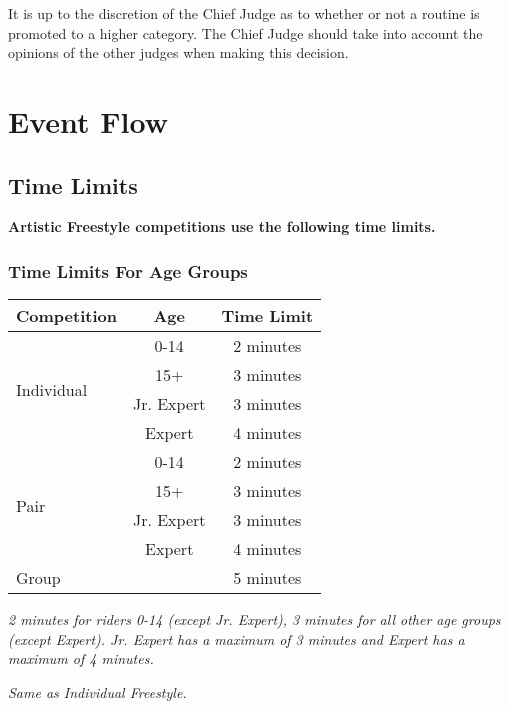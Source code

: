 It is up to the discretion of the Chief Judge as to whether or not a routine is promoted to a higher category.
The Chief Judge should take into account the opinions of the other judges when making this decision.

\section{Event Flow}

\subsection{Time Limits}

\textbf{Artistic Freestyle competitions use the following time limits.}

\subsubsection{Time Limits For Age Groups}

\begin{tabular}{|l|c|c|}
\hline
\textbf{Competition} & \textbf{Age} & \textbf{Time Limit} \\
\hline
\multirow{4}{*}{Individual} & 0-14 & 2 minutes \\
\cline{2-3}
& 15+ & 3 minutes \\ 
\cline{2-3}
& Jr. Expert & 3 minutes \\ 
\cline{2-3}
& Expert & 4 minutes \\
\hline
\multirow{4}{*}{Pair} & 0-14 & 2 minutes \\
\cline{2-3}
& 15+ & 3 minutes \\
\cline{2-3}
& Jr. Expert & 3 minutes \\
\cline{2-3}
& Expert & 4 minutes \\
\hline
Group &  & 5 minutes \\
\hline
\end{tabular}

\textit{2 minutes for riders 0-14 (except Jr. Expert), 3 minutes for all other age groups (except Expert).
Jr. Expert has a maximum of 3 minutes and Expert has a maximum of 4 minutes.}

\textit{Same as Individual Freestyle.}

